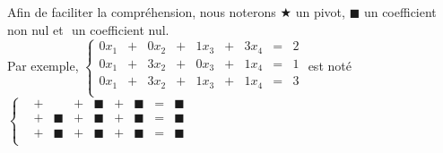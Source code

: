 \documentclass[a4paper]{book}
\begin{document}
\begin{Algorithme}
Afin de faciliter la compréhension, nous noterons $\bigstar$ un pivot, $\blacksquare$ un coefficient non nul et 
$ $ un coefficient nul.\\
Par exemple, 
$\left\{{\begin{matrix}
0x_{1}&+&0x_{2}&+&1x_{3}&+&3x_{4}&=&2\\
0x_{1}&+&3x_{2}&+&0x_{3}&+&1x_{4}&=&1\\
0x_{1}&+&3x_{2}&+&1x_{3}&+&1x_{4}&=&3\\
\end{matrix}}\right.$ est noté $\left\{{\begin{matrix}
&+&&+&\blacksquare&+&\blacksquare&=&\blacksquare\\
&+&\blacksquare&+&\blacksquare&+&\blacksquare&=&\blacksquare\\
&+&\blacksquare&+&\blacksquare&+&\blacksquare&=&\blacksquare\\
\end{matrix}}\right.$


\end{Algorithme}
\end{document}
